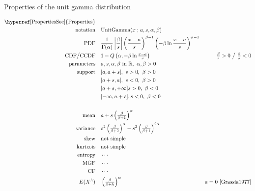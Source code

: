 

\begin{table*}[t!]
\caption[Unit gamma distribution -- Properties]{Properties of the unit gamma distribution}
\begin{align*}
\text{\hyperref[PropertiesSec]{Properties}}  \quad& \\
\text{notation} \quad & \text{UnitGamma}(x\given a,s,\alpha,\beta) 
\\
\text{PDF}\quad &  \frac{1}{\Gamma(\alpha)} \left|\frac{\beta}{ s}\right|
\left(\frac{x-a}{s}\right)^{\beta-1} \left(-\beta \ln   \frac{x-a}{s} \right)^{\alpha-1} \checked
\\
\text{CDF} \big/ \text{CCDF}  \quad  & 1-Q\left(\alpha, -\beta \ln \tfrac{x-a}{s} \right)
& \tfrac{\beta}{s}  >0 \ \big{/} \ \tfrac{\beta}{s}<0   \checked
\\
\text{parameters}\quad &   a, s,\alpha,\beta \text{ in } \Real  ,\  \alpha, \beta>0
\\
\text{support}\checked \quad 
	&   [a,a+s] ,\ s>0,\ \beta>0 \\
	&  [a+s,a], \ s<0,\ \beta>0 \\
	& [a+s,+\infty]  s>0,\ \beta<0  \\
 	& [-\infty,a+s], s<0,\ \beta<0 \\
\\
\text{mean} \quad  &  a + s \left(\tfrac{\beta}{\beta+1} \right)^{\alpha} \checked
\\
\text{variance} \quad  & s^2 \left(\tfrac{\beta}{\beta+2} \right)^{\alpha} - s^2 \left(\tfrac{\beta}{\beta+1} \right)^{2\alpha} \checked
\\
\text{skew} \quad  &   \text{not simple}
\\
\text{kurtosis} \quad  &   \text{not simple}
\\
\text{entropy} \quad  & \cdots
\\
\text{MGF} \quad  &  \cdots
\\
\text{CF} \quad  &  \cdots
\\
E(X^h) \quad & \left(\tfrac{\beta}{\beta+h} \right)^{\alpha} \qquad  & a=0 \
\text{\cite{Grassia1977}} \checked
\end{align*}
\end{table*}